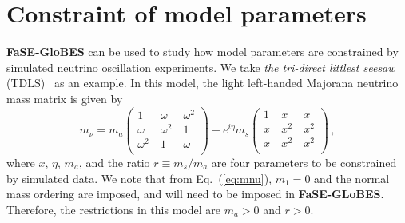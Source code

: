 \documentclass[aps,prd,nofootinbib,preprint]{revtex4}
\begin{document}
\section{Constraint of model parameters}

\textbf{FaSE-GloBES} can be used to study how model parameters are constrained by simulated neutrino oscillation experiments. We take \textit{the tri-direct littlest seesaw} (TDLS)~\cite{King:2013iva,King:2015dvf,King:2016yvg} as an example. In this model, the light left-handed Majorana neutrino mass matrix is given by
\begin{equation}
\label{eq:mnu}  m_{\nu}=m_{a}\begin{pmatrix}
 1 &~ \omega  &~ \omega ^2 \\
 \omega  &~ \omega ^2 &~ 1 \\
 \omega ^2 &~ 1 &~ \omega  \\
\end{pmatrix}+e^{i\eta}m_{s}
\begin{pmatrix}
 1 &~  x &~  x \\
 x &~ x^2 &~ x^2 \\
 x &~ x^2 &~ x^2 \\
\end{pmatrix}\,,
\end{equation}
where $x$, $\eta$, $m_a$, and the ratio $r\equiv m_s/m_a$ are four parameters to be constrained by simulated data. We note that from Eq.~(\ref{eq:mnu}), $m_1=0$ and the normal mass ordering are imposed, and will need to be imposed in \textbf{FaSE-GLoBES}. Therefore, the restrictions in this model are $m_a>0$ and $r>0$.
\end{document}
